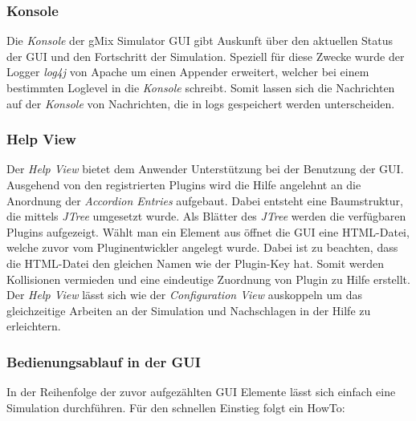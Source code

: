\documentclass[a4paper, 11pt]{article} %
\begin{document}
\subsubsection{Konsole} %
\label{ssub:consoleview}
Die \emph{Konsole} der gMix Simulator GUI gibt Auskunft über den aktuellen Status der GUI und den Fortschritt der Simulation. Speziell für diese Zwecke wurde der Logger \emph{log4j} von Apache um einen Appender erweitert, welcher bei einem bestimmten Loglevel in die \emph{Konsole} schreibt. Somit lassen sich die Nachrichten auf der \emph{Konsole} von Nachrichten, die in logs gespeichert werden unterscheiden.

\subsubsection{Help View} %
\label{ssub:helpview}
Der \emph{Help View} bietet dem Anwender Unterstützung bei der Benutzung der GUI. Ausgehend von den registrierten Plugins wird die Hilfe angelehnt an die Anordnung der \emph{Accordion Entries} aufgebaut. Dabei entsteht eine Baumstruktur, die mittels \emph{JTree} umgesetzt wurde. Als Blätter des \emph{JTree} werden die verfügbaren Plugins aufgezeigt. Wählt man ein Element aus öffnet die GUI eine HTML-Datei, welche zuvor vom Pluginentwickler angelegt wurde. Dabei ist zu beachten, dass die HTML-Datei den gleichen Namen wie der Plugin-Key hat. Somit werden Kollisionen vermieden und eine eindeutige Zuordnung von Plugin zu Hilfe erstellt. Der \emph{Help View} lässt sich wie der \emph{Configuration View} auskoppeln um das gleichzeitige Arbeiten an der Simulation und Nachschlagen in der Hilfe zu erleichtern.

\subsubsection{Bedienungsablauf in der GUI}
\label{ssub:bedienung}
In der Reihenfolge der zuvor aufgezählten GUI Elemente lässt sich einfach eine Simulation durchführen. Für den schnellen Einstieg folgt  ein HowTo:
\end{document}
